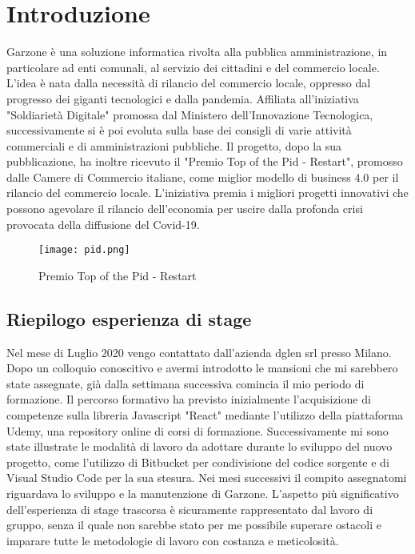 \mainmatter
\chapter{Introduzione}
Garzone è una soluzione informatica rivolta alla pubblica amministrazione, in particolare ad enti comunali, al servizio dei cittadini e del commercio locale. L'idea è nata dalla necessità di rilancio del commercio locale, oppresso dal progresso dei giganti tecnologici e dalla pandemia. Affiliata all'iniziativa "Soldiarietà Digitale" promossa dal Ministero dell’Innovazione Tecnologica, successivamente si è poi evoluta sulla base dei consigli di varie attività commerciali e di amministrazioni pubbliche. Il progetto, dopo la sua pubblicazione, ha inoltre ricevuto il "Premio Top of the Pid - Restart", promosso dalle Camere di Commercio italiane, come miglior modello di business 4.0 per il rilancio del commercio locale. L’iniziativa premia i migliori progetti innovativi che possono agevolare il rilancio dell’economia per uscire dalla profonda crisi provocata della diffusione del Covid-19.
\begin{figure}[!htb]
    \centering
    \texttt{[image: pid.png]}
    \caption{Premio Top of the Pid - Restart}
\end{figure}
\section{Riepilogo esperienza di stage}
Nel mese di Luglio 2020 vengo contattato dall'azienda dglen srl presso Milano. Dopo un colloquio conoscitivo e avermi introdotto le mansioni che mi sarebbero state assegnate, già dalla settimana successiva comincia il mio periodo di formazione. Il percorso formativo ha previsto inizialmente l'acquisizione di competenze sulla libreria Javascript "React" mediante l'utilizzo della piattaforma Udemy, una repository online di corsi di formazione. Successivamente mi sono state illustrate le modalità di lavoro da adottare durante lo sviluppo del nuovo progetto, come l'utilizzo di Bitbucket per condivisione del codice sorgente e di Visual Studio Code per la sua stesura. Nei mesi successivi il compito assegnatomi riguardava lo sviluppo e la manutenzione di Garzone. L'aspetto più significativo dell'esperienza di stage trascorsa è sicuramente rappresentato dal lavoro di gruppo, senza il quale non sarebbe stato per me possibile superare ostacoli e imparare tutte le metodologie di lavoro con costanza e meticolosità.


